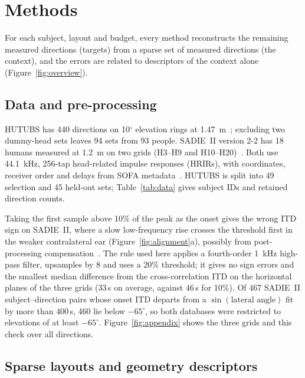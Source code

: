 \documentclass[11pt,a4paper]{article}
\newcommand{\us}{\,\textmu s}
\begin{document}
\section{Methods}
\label{sec:methods}

For each subject, layout and budget, every method reconstructs the remaining measured directions (targets) from a sparse set of measured directions (the context), and the errors are related to descriptors of the context alone (Figure~\ref{fig:overview}).

\subsection{Data and pre-processing}
\label{sec:data}

HUTUBS has 440 directions on 10$^\circ$ elevation rings at 1.47~m~\cite{brinkmann2019,hutubs}; excluding two dummy-head sets leaves 94 sets from 93 people. SADIE~II version 2-2 has 18 humans measured at 1.2~m on two grids (H3--H9 and H10--H20)~\cite{armstrong2018,sadie}. Both use 44.1~kHz, 256-tap head-related impulse responses (HRIRs), with coordinates, receiver order and delays from SOFA metadata~\cite{majdak2022}. HUTUBS is split into 49 selection and 45 held-out sets; Table~\ref{tab:data} gives subject IDs and retained direction counts.

Taking the first sample above 10\% of the peak as the onset gives the wrong ITD sign on SADIE~II, where a slow low-frequency rise crosses the threshold first in the weaker contralateral ear (Figure~\ref{fig:alignment}a), possibly from post-processing compensation~\cite{armstrong2018}. The rule used here applies a fourth-order 1~kHz high-pass filter, upsamples by 8 and uses a 20\% threshold; it gives no sign errors and the smallest median difference from the cross-correlation ITD on the horizontal planes of the three grids (33\us{} on average, against 46\us{} for 10\%). Of 467 SADIE~II subject--direction pairs whose onset ITD departs from a $\sin(\text{lateral angle})$ fit by more than 400\us, 460 lie below $-65^\circ$, so both databases were restricted to elevations of at least $-65^\circ$. Figure~\ref{fig:appendix} shows the three grids and this check over all directions.

\subsection{Sparse layouts and geometry descriptors}
\label{sec:layouts}
\end{document}
